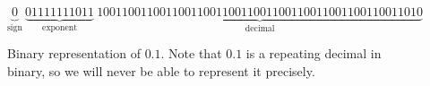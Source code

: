 \documentclass[justified, nobib]{tufte-handout}
\newcommand{\matplotlibGalleryLink}{http://matplotlib.org/gallery.html}
\newcommand{\matplotlibGalleryNote}{\footnote{You will need the syntax for
      matplotlib. You can find everything with the help commands, or can get
      syntax and ideas from \href{\matplotlibGalleryLink}{example plots} that
      others have made.}}
\begin{document}
\begin{figure}[hb]
\small
$$\underbrace{0}_{\text{sign}} \: \underbrace{01111111011}_{\text{exponent}} \: \underbrace{1001100110011001100110011001100110011001100110011010}_{\text{decimal}}$$
\caption{Binary representation of $0.1$. Note that $0.1$ is a repeating decimal in binary, so we will never be able to represent it precisely.}
\end{figure}







\end{document}
